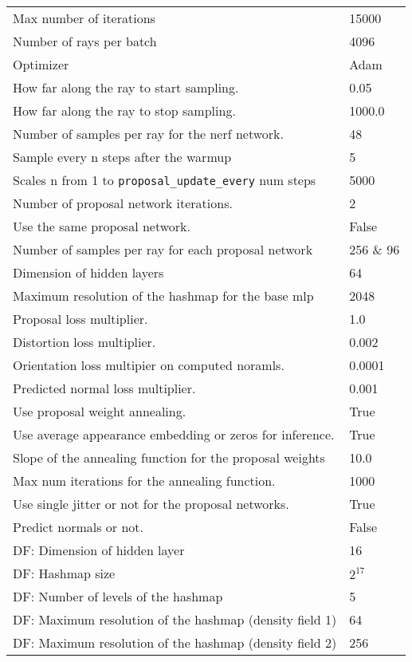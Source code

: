 \begin{longtable}{|l|l|}
\hline
\endlastfoot
Max number of iterations & 15000 \\
Number of rays per batch & 4096 \\
Optimizer & Adam \\
How far along the ray to start sampling.                & 0.05 \\
How far along the ray to stop sampling.                 & 1000.0 \\
Number of samples per ray for the nerf network.         & 48 \\
Sample every n steps after the warmup                   & 5 \\
Scales n from 1 to \texttt{proposal\_update\_every} num steps & 5000 \\
Number of proposal network iterations.                  & 2 \\
Use the same proposal network. & False \\
Number of samples per ray for each proposal network & 256 \& 96 \\
Dimension of hidden layers & 64 \\
Maximum resolution of the hashmap for the base \acrshort{mlp} & 2048 \\
Proposal loss multiplier.                               & 1.0 \\
Distortion loss multiplier.                             & 0.002 \\
Orientation loss multipier on computed noramls.         & 0.0001 \\
Predicted normal loss multiplier.                       & 0.001 \\
Use proposal weight annealing.               & True \\
Use average appearance embedding or zeros for inference. & True \\
Slope of the annealing function for the proposal weights & 10.0 \\
Max num iterations for the annealing function.          & 1000 \\
Use single jitter or not for the proposal networks. & True \\
Predict normals or not.                      & False \\
DF: Dimension of hidden layer           & 16 \\
DF: Hashmap size                        & $2^{17}$ \\
DF: Number of levels of the hashmap     & 5 \\
DF: Maximum resolution of the hashmap (density field 1)         & 64 \\
DF: Maximum resolution of the hashmap (density field 2)         & 256 \\
\end{longtable}

